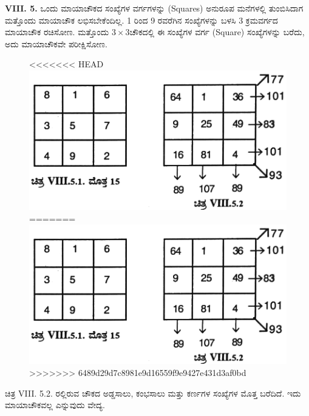 \textbf{VIII. 5.} ಒಂದು ಮಾಯಾಚೌಕದ ಸಂಖ್ಯೆಗಳ ವರ್ಗಗಳನ್ನು (Squares) ಅನುರೂಪ ಮನೆಗಳಲ್ಲಿ ತುಂಬಿಸಿದಾಗ ಮತ್ತೊಂದು ಮಾಯಾಚೌಕ ಲಭಿಸಬೇಕೆಂದಿಲ್ಲ. 1 ರಿಂದ 9 ರವರೆ\-ಗಿನ ಸಂಖ್ಯೆಗಳನ್ನು ಬಳಸಿ 3 ಕ್ರಮವರ್ಗದ ಮಾಯಾಚೌಕ ರಚಿಸೋಣ. ಮತ್ತೊಂದು $3 \times 3$ಚೌಕದಲ್ಲಿ ಈ ಸಂಖ್ಯೆಗಳ ವರ್ಗ (Square) ಸಂಖ್ಯೆಗಳನ್ನು ಬರೆದು, ಅದು ಮಾಯಾಚೌಕವೇ ಪರೀಕ್ಷಿಸೋಣ.
\begin{figure}[H]
<<<<<<< HEAD
\includegraphics{src/figures/chap7/fig7-16.jpg}
=======
\includegraphics[scale=0.85]{src/figures/chap7/fig7.16.jpg}
>>>>>>> 6489d29d7c8981e9d16559f9e9427e431d3af0bd
\end{figure}

ಚಿತ್ರ VIII. 5.2. ರಲ್ಲಿರುವ ಚೌಕದ ಅಡ್ಡಸಾಲು, ಕಂಭಸಾಲು ಮತ್ತು ಕರ್ಣಗಳ ಸಂಖ್ಯೆಗಳ ಮೊತ್ತ ಬರೆದಿದೆ. ಇದು ಮಾಯಾಚೌಕವಲ್ಲ ಎನ್ನುವುದು ವೇದ್ಯ.

